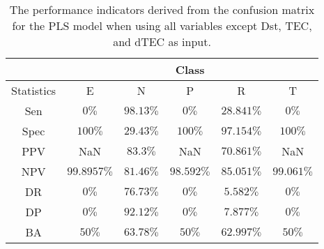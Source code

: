 \begin{table}[!ht]
	\centering
	\begin{tabular}{|c|c|c|c|c|c|}
		\hline
		 & \multicolumn{5}{c|}{Class} \\ \hline
		Statistics & E & N & P & R & T \\ \hline
		Sen & $0\%$ & $98.13\%$ & $0\%$ & $28.841\%$ & $0\%$ \\ \hline
		Spec & $100\%$ & $29.43\%$ & $100\%$ & $97.154\%$ & $100\%$ \\ \hline
		PPV & NaN & $83.3\%$ & NaN & $70.861\%$ & NaN \\ \hline
		NPV & $99.8957\%$ & $81.46\%$ & $98.592\%$ & $85.051\%$ & $99.061\%$ \\ \hline
		DR & $0\%$ & $76.73\%$ & $0\%$ & $5.582\%$ & $0\%$ \\ \hline
		DP & $0\%$ & $92.12\%$ & $0\%$ & $7.877\%$ & $0\%$ \\ \hline
		BA & $50\%$ & $63.78\%$ & $50\%$ & $62.997\%$ & $50\%$ \\ \hline
	\end{tabular}
	\caption{The performance indicators derived from the confusion matrix for the PLS model when using all variables except Dst, TEC, and dTEC as input.}
	\label{tab:cs:reverse:noTEC:pls}
\end{table}
